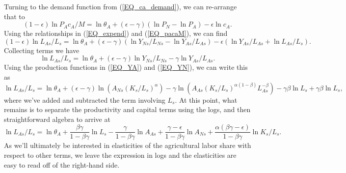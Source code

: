 \documentclass[11pt]{article}
\begin{document}
Turning to the demand function from (\ref{EQ_ca_demand}), we can re-arrange that to
\begin{equation}
   (1-\epsilon) \ln P_A c_A/M = \ln \theta_A  + (\epsilon-\gamma)(\ln P_N - \ln P_A) - \epsilon \ln c_A. \nonumber
\end{equation}
Using the relationships in (\ref{EQ_expend}) and (\ref{EQ_pacaM}), we can find
\begin{equation}
    (1-\epsilon)\ln L_{As}/L_s = \ln \theta_A + (\epsilon-\gamma)\left(\ln Y_{Ns}/L_{Ns} - \ln Y_{As}/L_{As} \right) - \epsilon \left(\ln Y_{As}/L_{As} + \ln L_{As}/L_s \right). \nonumber
\end{equation}
Collecting terms we have
\begin{equation}
    \ln L_{As}/L_s = \ln \theta_A + (\epsilon-\gamma) \ln Y_{Ns}/L_{Ns} - \gamma \ln Y_{As}/L_{As}. \nonumber
\end{equation}
Using the production functions in (\ref{EQ_YA}) and (\ref{EQ_YN}), we can write this as
\begin{equation}
    \ln  L_{As}/L_s = \ln \theta_A + (\epsilon-\gamma) \ln \left(A_{Ns} (K_s/L_s)^{\alpha}\right) - \gamma \ln \left(A_{As} (K_s/L_s)^{\alpha(1-\beta)} L_{As}^{-\beta}\right) - \gamma \beta \ln L_s + \gamma \beta \ln L_s, \nonumber
\end{equation}
where we've added and subtracted the term involving $L_s$. At this point, what remains is to separate the productivity and capital terms using the logs, and then straightforward algebra to arrive at
\begin{equation}
    \ln L_{As}/L_s = \ln \theta_A + \frac{\beta\gamma}{1-\beta\gamma} \ln L_s - \frac{\gamma}{1-\beta\gamma} \ln A_{As} + \frac{\gamma - \epsilon}{1-\beta\gamma} \ln A_{Ns} + \frac{\alpha(\beta\gamma - \epsilon)}{1-\beta\gamma} \ln K_s/L_s. \label{EQ_lnLAL}
\end{equation}
As we'll ultimately be interested in elasticities of the agricultural labor share with respect to other terms, we leave the expression in logs and the elasticities are easy to read off of the right-hand side.
\end{document}
